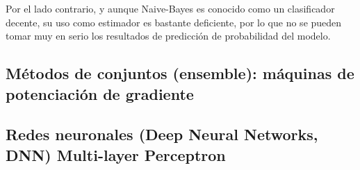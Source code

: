 Por el lado contrario, y aunque Naive-Bayes es conocido como un clasificador decente, su uso como estimador es bastante deficiente, por lo que no se pueden tomar muy en serio los resultados de predicción de probabilidad del modelo.

\subsection{Métodos de conjuntos (ensemble): máquinas de potenciación de gradiente}
\subsection{Redes neuronales (Deep Neural Networks, DNN) Multi-layer Perceptron}

\color{Black}

